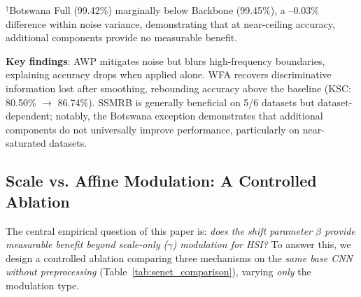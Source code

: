 \documentclass[conference]{IEEEtran}
\begin{document}
\begin{table}[!t]
\caption{Ablation Study Results Under 5~dB AWGN (OA \%)}
\label{tab:ablation}
\centering
{}
\begin{flushleft}
\footnotesize{$^\dagger$Botswana Full (99.42\%) marginally below Backbone (99.45\%), a --0.03\% difference within noise variance, demonstrating that at near-ceiling accuracy, additional components provide no measurable benefit.}
\end{flushleft}
\end{table}

\textbf{Key findings}: AWP mitigates noise but blurs high-frequency boundaries, explaining accuracy drops when applied alone. WFA recovers discriminative information lost after smoothing, rebounding accuracy above the baseline (KSC: 80.50\% $\to$ 86.74\%). SSMRB is generally beneficial on 5/6 datasets but dataset-dependent; notably, the Botswana exception demonstrates that additional components do not universally improve performance, particularly on near-saturated datasets.

\subsection{Scale vs. Affine Modulation: A Controlled Ablation}
\label{sec:senet_ablation}

The central empirical question of this paper is: \textit{does the shift parameter $\beta$ provide measurable benefit beyond scale-only ($\gamma$) modulation for HSI?} To answer this, we design a controlled ablation comparing three mechanisms on the \textit{same base CNN without preprocessing} (Table~\ref{tab:senet_comparison}), varying \textit{only} the modulation type.
\end{document}
